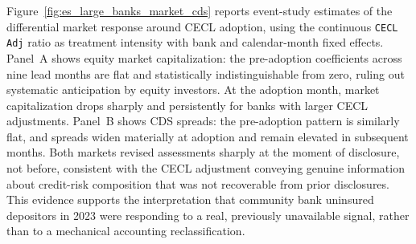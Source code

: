 Figure~\ref{fig:es_large_banks_market_cds} reports event-study estimates of
the differential market response around CECL adoption, using the continuous
\texttt{CECL Adj} ratio as treatment intensity with bank and
calendar-month fixed effects.  Panel~A shows equity market capitalization:
the pre-adoption coefficients across nine lead months are flat and
statistically indistinguishable from zero, ruling out systematic anticipation
by equity investors.  At the adoption month, market capitalization drops
sharply and persistently for banks with larger CECL adjustments.  Panel~B
shows CDS spreads: the pre-adoption pattern is similarly flat, and spreads
widen materially at adoption and remain elevated in subsequent months.
Both markets revised assessments sharply at the moment of disclosure, not
before, consistent with the CECL adjustment conveying genuine information
about credit-risk composition that was not recoverable from prior disclosures.
This evidence supports the interpretation that community bank uninsured
depositors in 2023 were responding to a real, previously unavailable signal,
rather than to a mechanical accounting reclassification.
